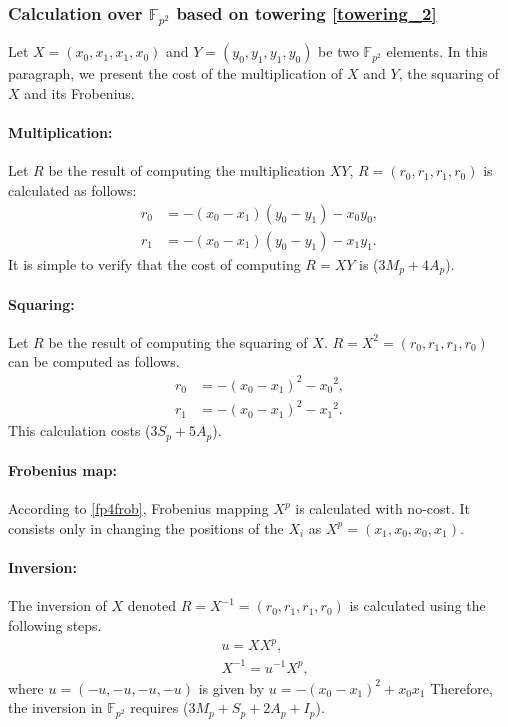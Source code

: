 \subsubsection{Calculation over \texorpdfstring{$\mathbb{F}_{p^2}$}{} based on towering \texorpdfstring{\eqref{towering_2}}{}}
Let $X=(x_0,x_1,x_1,x_0)$ and $Y=(y_0,y_1,y_1,y_0)$ be  two $\mathbb{F}_{p^2}$ elements.  In this paragraph, we present the cost of the multiplication of $X$ and $Y$, the squaring of $X$ and its Frobenius.
\paragraph{\bf{Multiplication:} }
Let $R$ be the result of computing the multiplication $X Y$, $R=(r_0,r_1,r_1,r_0)$ is calculated as follows:
\begin{align}
r_0&= -(x_0-x_1)(y_0-y_1)-x_0y_0, \nonumber \\
r_1&=-(x_0-x_1)(y_0-y_1)-x_1y_1. \nonumber
\end{align}
It is simple to verify that the cost of computing $R=XY$ is ($3M_p+4A_p$).
\paragraph{\bf{Squaring:}}
Let $R$ be the result of computing the squaring of $X$. $R=X^2=(r_0,r_1,r_1,r_0)$ can be computed  as follows. 
\begin{align}
r_0&= -(x_0-x_1)^2-{x_0}^2, \nonumber \\
r_1&= -(x_0-x_1)^2-{x_1}^2. \nonumber
\end{align}
This calculation costs ($3S_p+5A_p$).
\paragraph{\bf{Frobenius map:}}
According to \eqref{fp4frob}, Frobenius mapping $X^{p}$ is calculated with no-cost. It consists only in changing the positions of the $X_i$ as $X^{p}=(x_1,x_0,x_0,x_1)$.
\paragraph{\bf{Inversion:}}
The inversion of $X$ denoted  $R=X^{-1}=(r_0,r_1,r_1,r_0)$ is calculated using the following steps.
\begin{eqnarray}
&u=XX^{p}, \nonumber \\
&X^{-1}=u^{-1}X^{p}, \nonumber
\end{eqnarray}
where $u=(-u,-u,-u,-u)$ is given by $u=-(x_0-x_1)^2+x_0x_1$
Therefore, the inversion in $\mathbb{F}_{p^2}$ requires  ($3M_p+S_p+2A_p+I_p$).

